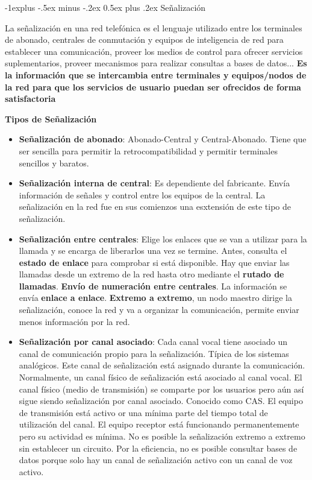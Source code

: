 \documentclass[10pt,portrait, twocolumn]{article}
\makeatletter
\renewcommand{\subsection}{\@startsection{subsection}{2}{0mm}%
                                {-1explus -.5ex minus -.2ex}%
                                {0.5ex plus .2ex}%
                                {\normalfont\normalsize\bfseries}}
\makeatother
\begin{document}
\hrulefill

\subsection{Señalización}

La señalización en una red telefónica es el lenguaje utilizado entre los terminales de abonado, centrales de conmutación y equipos de inteligencia de red para establecer una comunicación, proveer los medios de control para ofrecer servicios suplementarios, proveer mecanismos para realizar consultas a bases de datos... \textbf{Es la información que se intercambia entre terminales y equipos/nodos de la red para que los servicios de usuario puedan ser ofrecidos de forma satisfactoria}

\textbf{Tipos de Señalización}

	\begin{itemize}
		\item \textbf{Señalización de abonado}: Abonado-Central y Central-Abonado. Tiene que ser sencilla para permitir la retrocompatibilidad y permitir terminales sencillos y baratos.
		\item \textbf{Señalización interna de central}: Es dependiente del fabricante. Envía información de señales y control entre los equipos de la central. La señalización en la red fue en sus comienzos una esxtensión de este tipo de señalización.
		\item \textbf{Señalización entre centrales}: Elige los enlaces que se van a utilizar para la llamada y se encarga de liberarlos una vez se termine. Antes, consulta el \textbf{estado de enlace} para comprobar si está disponible. Hay que enviar las llamadas desde un extremo de la red hasta otro mediante el \textbf{rutado de llamadas}. \textbf{Envío de numeración entre centrales}. La información se envía \textbf{enlace a enlace}. \textbf{Extremo a extremo}, un nodo maestro dirige la señalización, conoce la red y va a organizar la comunicación, permite enviar menos información por la red.
		\item \textbf{Señalización por canal asociado}: Cada canal vocal tiene asociado un canal de comunicación propio para la señalización. Típica de los sistemas analógicos. Este canal de señalización está asignado durante la comunicación. Normalmente, un canal físico de señalización está asociado al canal vocal. El canal físico (medio de transmisión) se comparte por los usuarios pero aún así sigue siendo señalización por canal asociado. Conocido como CAS. El equipo de transmisión está activo or una mínima parte del tiempo total de utilización del canal. El equipo receptor está funcionando permanentemente pero su actividad es mínima. No es posible la señalización extremo a extremo sin establecer un circuito. Por la eficiencia, no es posible consultar bases de datos porque solo hay un canal de señalización activo con un canal de voz activo.
	\end{itemize}
	
\end{document}
